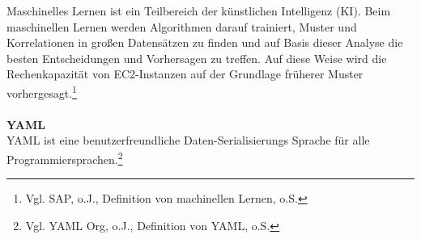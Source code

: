 Maschinelles Lernen ist ein Teilbereich der künstlichen Intelligenz (KI). Beim maschinellen Lernen werden Algorithmen darauf trainiert, Muster und Korrelationen in großen Datensätzen zu finden und auf Basis dieser Analyse die besten Entscheidungen und Vorhersagen zu treffen. Auf diese Weise wird die Rechenkapazität von EC2-Instanzen auf der Grundlage früherer Muster vorhergesagt.\footnote{Vgl. SAP, o.J., Definition von machinellen Lernen, o.S.\cite{ML1}}
\\\\
\textbf{YAML}\\
YAML ist eine benutzerfreundliche Daten-Serialisierungs  Sprache für alle Programmiersprachen.\footnote{Vgl. YAML Org, o.J., Definition von YAML, o.S.\cite{YAML}}
